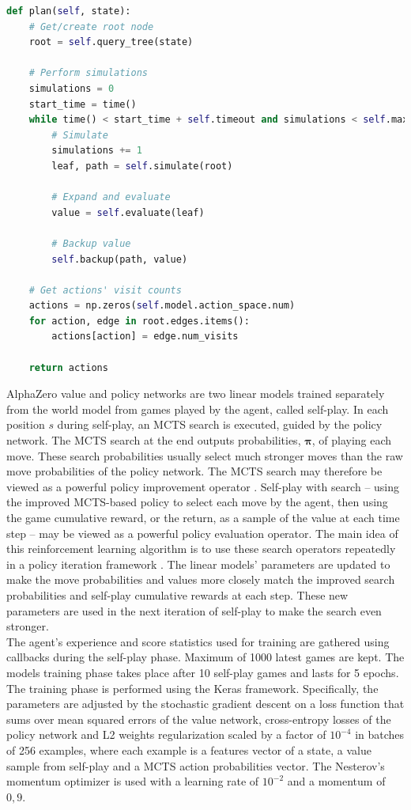 \noindent\begin{minipage}{\textwidth} %
\begin{lstlisting}[language=Python]
def plan(self, state):
    # Get/create root node
    root = self.query_tree(state)

    # Perform simulations
    simulations = 0
    start_time = time()
    while time() < start_time + self.timeout and simulations < self.max_simulations:
        # Simulate
        simulations += 1
        leaf, path = self.simulate(root)

        # Expand and evaluate
        value = self.evaluate(leaf)

        # Backup value
        self.backup(path, value)

    # Get actions' visit counts
    actions = np.zeros(self.model.action_space.num)
    for action, edge in root.edges.items():
        actions[action] = edge.num_visits

    return actions
\end{lstlisting}
\end{minipage}

AlphaZero value and policy networks are two linear models trained separately from the world model from games played by the agent, called self-play. In each position $s$ during self-play, an MCTS search is executed, guided by the policy network. The MCTS search at the end outputs probabilities, $\boldsymbol\pi$, of playing each move. These search probabilities usually select much stronger moves than the raw move probabilities of the policy network. The MCTS search may therefore be viewed as a powerful policy improvement operator \cite{Book.RLAI}. Self-play with search – using the improved MCTS-based policy to select each move by the agent, then using the game cumulative reward, or the return, as a sample of the value at each time step – may be viewed as a powerful policy evaluation operator. The main idea of this reinforcement learning algorithm is to use these search operators repeatedly in a policy iteration framework \cite{Algo.AlphaGoZero}. The linear models' parameters are updated to make the move probabilities and values more closely match the improved search probabilities and self-play cumulative rewards at each step. These new parameters are used in the next iteration of self-play to make the search even stronger. \\
The agent's experience and score statistics used for training are gathered using callbacks during the self-play phase. Maximum of 1000 latest games are kept. The models training phase takes place after 10 self-play games and lasts for 5 epochs. The training phase is performed using the Keras \cite{Code.Keras} framework. Specifically, the parameters are adjusted by the stochastic gradient descent on a loss function that sums over mean squared errors of the value network, cross-entropy losses of the policy network and L2 weights regularization scaled by a factor of $10^{-4}$ in batches of 256 examples, where each example is a features vector of a state, a value sample from self-play and a MCTS action probabilities vector. The Nesterov's momentum optimizer \cite{Algo.Nesterov} is used with a learning rate of $10^{-2}$ and a momentum of $0,9$.

